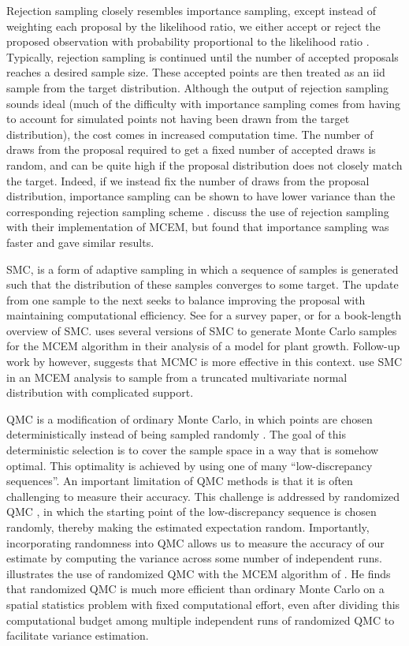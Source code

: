 \documentclass[11pt, oneside]{article}   	%
\begin{document}
Rejection sampling closely resembles importance sampling, except instead of weighting each proposal by the likelihood ratio, we either accept or reject the proposed observation with probability proportional to the likelihood ratio \citep{Rob04}. Typically, rejection sampling is continued until the number of accepted proposals reaches a desired sample size. These accepted points are then treated as an iid sample from the target distribution. Although the output of rejection sampling sounds ideal (much of the difficulty with importance sampling comes from having to account for simulated points not having been drawn from the target distribution), the cost comes in increased computation time. The number of draws from the proposal required to get a fixed number of accepted draws is random, and can be quite high if the proposal distribution does not closely match the target. Indeed, if we instead fix the number of draws from the proposal distribution, importance sampling can be shown to have lower variance than the corresponding rejection sampling scheme \citep[see Section 8.8 of][]{Cho20}. \citet{Boo99} discuss the use of rejection sampling with their implementation of MCEM, but found that importance sampling was faster and gave similar results.

SMC, is a form of adaptive sampling in which a sequence of samples is generated such that the distribution of these samples converges to some target. The update from one sample to the next seeks to balance improving the proposal with maintaining computational efficiency. See \citet{Del06} for a survey paper, or \citet{Cho20} for a book-length overview of SMC. \citet{Tre13} uses several versions of SMC to generate Monte Carlo samples for the MCEM algorithm in their analysis of a model for plant growth. Follow-up work by \citet{Tre14} however, suggests that MCMC is more effective in this context. \citet{Mof14} use SMC in an MCEM analysis to sample from a truncated multivariate normal distribution with complicated support.

QMC is a modification of ordinary Monte Carlo, in which points are chosen deterministically instead of being sampled randomly \citep{Caf98}. The goal of this deterministic selection is to cover the sample space in a way that is somehow optimal. This optimality is achieved by using one of many ``low-discrepancy sequences''. An important limitation of QMC methods is that it is often challenging to measure their accuracy. This challenge is addressed by randomized QMC \citep{LEc02}, in which the starting point of the low-discrepancy sequence is chosen randomly, thereby making the estimated expectation random. Importantly, incorporating randomness into QMC allows us to measure the accuracy of our estimate by computing the variance across some number of independent runs. \citet{Jan05} illustrates the use of randomized QMC with the MCEM algorithm of \citet{Boo99}. He finds that randomized QMC is much more efficient than ordinary Monte Carlo on a spatial statistics problem with fixed computational effort, even after dividing this computational budget among multiple independent runs of randomized QMC to facilitate variance estimation.
\end{document}
